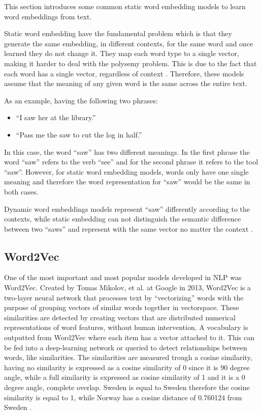     \par This section introduces some common static word embedding models to learn word embeddings from text.


    \par Static word embedding have the fundamental problem which is that they generate the same embedding, in different contexts, for the same word and once learned they do not change it. They map each word type to a single vector, making it harder to deal with the polysemy problem. This is due to the fact that each word has a single vector, regardless of context \cite{Mikolov2013}. Therefore, these models assume that the meaning of any given word is the same across the entire text.
   

    \par As an example, having the following two phrases:

    \begin{itemize}
        \item ``I saw her at the library.”
        \item ``Pass me the saw to cut the log in half.”
    \end{itemize}

    \par In this case, the word ``saw” has two different meanings. In the first phrase the word ``saw” refers to the verb ``see” and for the second phrase it refers to the tool ``saw”. However, for static word embedding models, words only have one single meaning and therefore  the word representation for \enquote{saw} would be the same in both cases.

    Dynamic word embeddings models represent ``saw” differently according to the contexts, while static embedding can not distinguish the semantic difference between two ``saws” and represent with the same vector no matter the context \cite{Wang2020} \cite{Batista2018}.
\newpage
   
        \subsection{Word2Vec}

        One of the most important and most popular models developed in NLP was Word2Vec. Created by Tomas Mikolov, et al. \cite{Mikolov2013} at Google in 2013, Word2Vec is a two-layer neural network that processes text by \enquote{vectorizing} words with the purpose of grouping vectors of similar words together in vectorspace. These similarities are detected by creating vectors that are distributed numerical representations of word features, without human intervention. A vocabulary is outputted from Word2Vec where each item has a vector attached to it. This can be fed into a deep-learning network or queried to detect relationships between words, like similarities. The similarities are measured trough a cosine similarity, having no similarity is expressed as a cosine similarity of 0 since it is 90 degree angle, while a full similarity is expressed as cosine similarity of 1 and it is a 0 degree angle, complete overlap. Sweden is equal to Sweden therefore the cosine similarity is equal to 1, while Norway has a cosine distance of 0.760124 from Sweden \cite{Wiki}.
        
